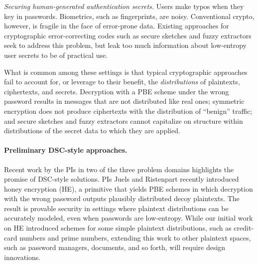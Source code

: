 {\begin{newitemize}
\item{\em Securing human-generated authentication secrets.} Users make typos
when they key in passwords. Biometrics, such as fingerprints, are noisy.
Conventional crypto, however, is fragile in the face of error-prone data. 
Existing approaches for cryptographic error-correcting codes such as secure
sketches and fuzzy extractors~\cite{DORS08} seek to address this problem, but leak too much
information about low-entropy user secrets to be of practical use.
\end{newitemize}
What is common among these settings is that 
typical cryptographic approaches fail to account for, or leverage to
their benefit, the \textit{distributions} of plaintexts, ciphertexts, and
secrets.
Decryption with a PBE scheme under the wrong
password results in messages that are not distributed like real ones; symmetric
encryption does not produce ciphertexts with the distribution of ``benign''
traffic; and secure sketches and fuzzy extractors cannot capitalize on structure within
distributions of the secret data to which they are applied. 

\paragraph{Preliminary DSC-style approaches.}
Recent work by the PIs in two of the three problem domains highlights the
promise of DSC-style solutions. PIs Juels and Ristenpart recently introduced
honey encryption (HE), a primitive that yields PBE schemes in which decryption with the
wrong password outputs plausibly distributed decoy plaintexts. The result is provable security in settings where plaintext distributions can be accurately modeled, even when passwords are low-entropy.  While our initial  work on HE introduced
schemes for some simple plaintext distributions, such as
credit-card numbers and prime numbers, extending this work to
other plaintext spaces, such as password managers, documents, and so forth, will require design innovations.

}
